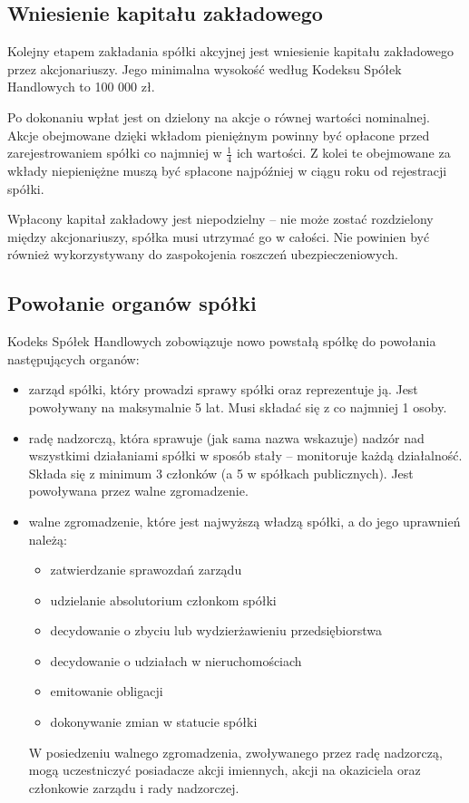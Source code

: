 \documentclass[11pt]{article}
\begin{document}
\subsection{Wniesienie kapitału zakładowego}


	Kolejny etapem zakładania spółki akcyjnej jest wniesienie kapitału zakładowego przez akcjonariuszy. Jego minimalna wysokość według Kodeksu Spółek Handlowych to 100 000 zł.
	
	Po dokonaniu wpłat jest on dzielony na akcje o równej wartości nominalnej. Akcje obejmowane dzięki wkładom pieniężnym powinny być opłacone przed zarejestrowaniem spółki co najmniej w $\frac{1}{4}$ ich wartości. Z kolei te obejmowane za wkłady niepieniężne muszą być spłacone najpóźniej w ciągu roku od rejestracji spółki.
	
	Wpłacony kapitał zakładowy jest niepodzielny – nie może zostać rozdzielony między akcjonariuszy, spółka musi utrzymać go w całości. Nie powinien być również wykorzystywany do zaspokojenia roszczeń ubezpieczeniowych.
	
	\subsection{Powołanie organów spółki}
	Kodeks Spółek Handlowych zobowiązuje nowo powstałą spółkę do powołania następujących organów:
	
	\begin{itemize}
	
	\item zarząd spółki, który prowadzi sprawy spółki oraz reprezentuje ją. Jest powoływany na maksymalnie 5 lat. Musi składać się z co najmniej 1 osoby.
	\item radę nadzorczą, która sprawuje (jak sama nazwa wskazuje) nadzór nad wszystkimi działaniami spółki w sposób stały – monitoruje każdą działalność. Składa się z minimum 3 członków (a 5 w spółkach publicznych). Jest powoływana przez walne zgromadzenie.
	\item walne zgromadzenie, które jest najwyższą władzą spółki, a do jego uprawnień należą:
	\begin{itemize}

	\item zatwierdzanie sprawozdań zarządu
	\item udzielanie absolutorium członkom spółki
	\item decydowanie o zbyciu lub wydzierżawieniu przedsiębiorstwa
	\item decydowanie o udziałach w nieruchomościach
	\item emitowanie obligacji
	\item dokonywanie zmian w statucie spółki
	
	\end{itemize}
	
	W posiedzeniu walnego zgromadzenia, zwoływanego przez radę nadzorczą, mogą uczestniczyć posiadacze akcji imiennych, akcji na okaziciela oraz członkowie zarządu i rady nadzorczej.
	
	\end{itemize}
	
\end{document}
